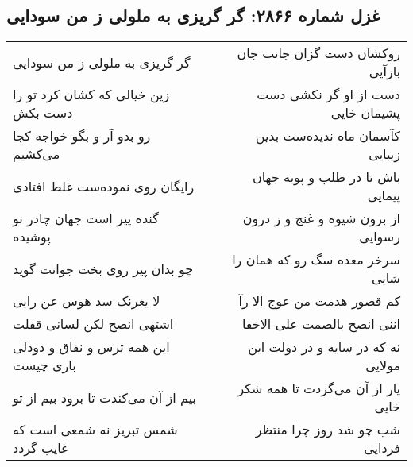 \begin{center}
\section*{غزل شماره ۲۸۶۶: گر گریزی به ملولی ز من سودایی}
\label{sec:2866}
\begin{longtable}{l p{0.5cm} r}
گر گریزی به ملولی ز من سودایی
&&
روکشان دست گزان جانب جان بازآیی
\\
زین خیالی که کشان کرد تو را دست بکش
&&
دست از او گر نکشی دست پشیمان خایی
\\
رو بدو آر و بگو خواجه کجا می‌کشیم
&&
کآسمان ماه ندیده‌ست بدین زیبایی
\\
رایگان روی نموده‌ست غلط افتادی
&&
باش تا در طلب و پویه جهان پیمایی
\\
گنده پیر است جهان چادر نو پوشیده
&&
از برون شیوه و غنج و ز درون رسوایی
\\
چو بدان پیر روی بخت جوانت گوید
&&
سرخر معده سگ رو که همان را شایی
\\
لا یغرنک سد هوس عن رایی
&&
کم قصور هدمت من عوج الا رآ
\\
اشتهی انصح لکن لسانی قفلت
&&
اننی انصح بالصمت علی الاخفا
\\
این همه ترس و نفاق و دودلی باری چیست
&&
نه که در سایه و در دولت این مولایی
\\
بیم از آن می‌کندت تا برود بیم از تو
&&
یار از آن می‌گزدت تا همه شکر خایی
\\
شمس تبریز نه شمعی است که غایب گردد
&&
شب چو شد روز چرا منتظر فردایی
\\
\end{longtable}
\end{center}
